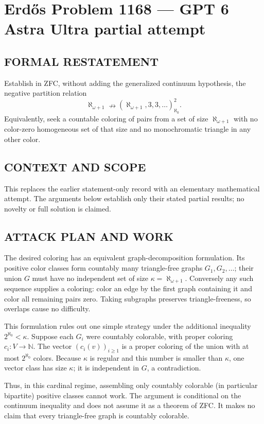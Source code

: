 \section*{Erd\H{o}s Problem 1168 --- GPT 6 Astra Ultra partial attempt}


\subsection*{FORMAL RESTATEMENT}
Establish in ZFC, without adding the generalized continuum hypothesis, the negative partition relation
\[
\aleph_{\omega+1}\nrightarrow(\aleph_{\omega+1},3,3,\ldots)_{\aleph_0}^{2}.
\]
Equivalently, seek a countable coloring of pairs from a set of size $\aleph_{\omega+1}$ with no color-zero homogeneous set of that size and no monochromatic triangle in any other color.

\subsection*{CONTEXT AND SCOPE}
This replaces the earlier statement-only record with an elementary mathematical attempt. The arguments below establish only their stated partial results; no novelty or full solution is claimed.

\subsection*{ATTACK PLAN AND WORK}
The desired coloring has an equivalent graph-decomposition formulation. Its
positive color classes form countably many triangle-free graphs $G_1,G_2,\ldots$;
their union $G$ must have no independent set of size
$\kappa=\aleph_{\omega+1}$. Conversely any such sequence supplies a coloring:
color an edge by the first graph containing it and color all remaining pairs zero.
Taking subgraphs preserves triangle-freeness, so overlaps cause no difficulty.

This formulation rules out one simple strategy under the additional inequality
$2^{\aleph_0}<\kappa$. Suppose each $G_i$ were countably colorable, with proper
coloring $c_i:V\to\mathbb N$. The vector $(c_i(v))_{i\ge1}$ is a proper coloring
of the union with at most $2^{\aleph_0}$ colors. Because $\kappa$ is regular and
this number is smaller than $\kappa$, one vector class has size $\kappa$; it is
independent in $G$, a contradiction.

Thus, in this cardinal regime, assembling only countably colorable (in particular
bipartite) positive classes cannot work. The argument is conditional on the
continuum inequality and does not assume it as a theorem of ZFC. It makes no
claim that every triangle-free graph is countably colorable.

